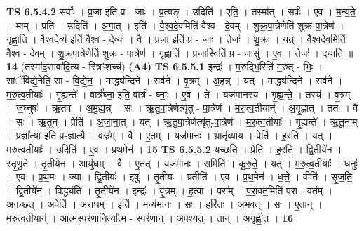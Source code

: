 \documentclass[17pt]{extarticle}
\begin{document}
                  \newline
                                \textbf{ TS 6.5.4.2} \newline
                  सर्वाः᳚ । प्र॒जा इति॑ प्र - जाः । प्र॒त्यङ् । उदिति॑ । ए॒ति॒ । तस्मा᳚त् । सर्वः॑ । ए॒व । म॒न्य॒ते॒ । माम् । प्रति॑ । उदिति॑ । अ॒गा॒त् । इति॑ । वै॒श्व॒दे॒वमिति॑ वैश्व - दे॒वम् । शु॒क्र॒पा॒त्रेणेति॑ शुक्र-पा॒त्रेण॑ । गृ॒ह्णा॒ति॒ । वै॒श्व॒दे॒व्य॑ इति॑ वैश्व - दे॒व्यः॑ । वै । प्र॒जा इति॑ प्र - जाः । तेजः॑ । शु॒क्रः । यत् । वै॒श्व॒दे॒वमिति॑ वैश्व - दे॒वम् । शु॒क्र॒पा॒त्रेणेति॑ शुक्र - पा॒त्रेण॑ । गृ॒ह्णाति॑ । प्र॒जास्विति॑ प्र - जासु॑ । ए॒व । तेजः॑ । द॒धा॒ति॒ ॥ \textbf{  14} \newline
                  \newline
                      (तस्मा॑द॒सावा॑दि॒त्य - स्त्रिꣳ॒॒शच्च॑)  \textbf{(A4)} \newline \newline
                                \textbf{ TS 6.5.5.1} \newline
                  इन्द्रः॑ । म॒रुद्भि॒रिति॑ म॒रुत् - भिः॒ । सांॅवि॑द्ये॒नेति॒ सां - वि॒द्ये॒न॒ । माद्ध्य॑न्दिने । सव॑ने । वृ॒त्रम् । अ॒ह॒न्न् । यत् । माद्ध्य॑न्दिने । सव॑ने । म॒रु॒त्व॒तीयाः᳚ । गृ॒ह्यन्ते᳚ । वार्त्र॑घ्ना॒ इति॒ वार्त्र॑ - घ्नाः॒ । ए॒व । ते । यज॑मानस्य । गृ॒ह्य॒न्ते॒ । तस्य॑ । वृ॒त्रम् । ज॒घ्नुषः॑ । ऋ॒तवः॑ । अ॒मु॒ह्य॒न्न् । सः । ऋ॒तु॒पा॒त्रेणेत्यृ॑तु - पा॒त्रेण॑ । म॒रु॒त्व॒तीयान्॑ । अ॒गृ॒ह्णा॒त् । ततः॑ । वै । सः । ऋ॒तून् । प्रेति॑ । अ॒जा॒ना॒त् । यत् । ऋ॒तु॒पा॒त्रेणेत्यृ॑तु-पा॒त्रेण॑ । म॒रु॒त्व॒तीयाः᳚ । गृ॒ह्यन्ते᳚ । ऋ॒तू॒नाम् । प्रज्ञा᳚त्या॒ इति॒ प्र-ज्ञा॒त्यै॒ । वज्र᳚म् । वै । ए॒तम् । यज॑मानः । भ्रातृ॑व्याय । प्रेति॑ । ह॒र॒ति॒ । यत् । म॒रु॒त्व॒तीयाः᳚ । उदिति॑ । ए॒व । प्र॒थ॒मेन॑ । \textbf{  15} \newline
                  \newline
                                \textbf{ TS 6.5.5.2} \newline
                  य॒च्छ॒ति॒ । प्रेति॑ । ह॒र॒ति॒ । द्वि॒तीये॑न । स्तृ॒णु॒ते । तृ॒तीये॑न । आयु॑धम् । वै । ए॒तत् । यज॑मानः । समिति॑ । कु॒रु॒ते॒ । यत् । म॒रु॒त्व॒तीयाः᳚ । धनुः॑ । ए॒व । प्र॒थ॒मः । ज्या । द्वि॒तीयः॑ । इषुः॑ । तृ॒तीयः॑ । प्रतीति॑ । ए॒व । प्र॒थ॒मेन॑ । ध॒त्ते॒ । वीति॑ । सृ॒ज॒ति॒ । द्वि॒तीये॑न । विद्ध्य॑ति । तृ॒तीये॑न । इन्द्रः॑ । वृ॒त्रम् । ह॒त्वा । परा᳚म् । प॒रा॒वत॒मिति॑ परा - वत᳚म् । अ॒ग॒च्छ॒त् । अपेति॑ । अ॒रा॒ध॒म् । इति॑ । मन्य॑मानः । सः । हरि॑तः । अ॒भ॒व॒त् । सः । ए॒तान् । म॒रु॒त्व॒तीयान्॑ । आ॒त्म॒स्पर॑णा॒नित्या᳚त्म - स्पर॑णान् । अ॒प॒श्य॒त् । तान् । अ॒गृ॒ह्णी॒त॒ । \textbf{  16} \newline
\end{document}
